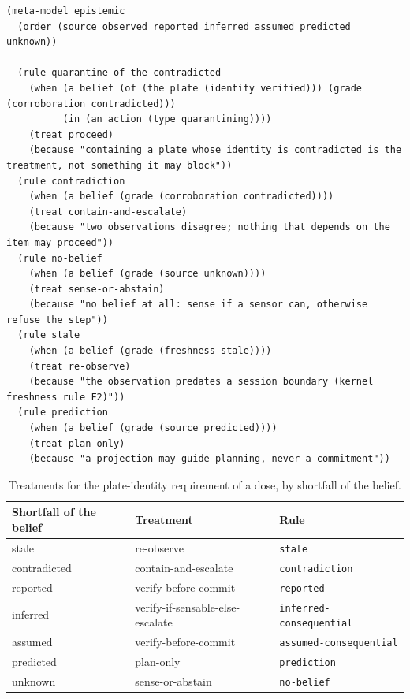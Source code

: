 \documentclass[10pt,a4paper]{article}
\begin{document}
\begin{listing}[tbp]
\begin{Verbatim}[fontsize=\footnotesize,breaklines,frame=lines,framesep=2mm]
(meta-model epistemic
  (order (source observed reported inferred assumed predicted unknown))

  (rule quarantine-of-the-contradicted
    (when (a belief (of (the plate (identity verified))) (grade (corroboration contradicted)))
          (in (an action (type quarantining))))
    (treat proceed)
    (because "containing a plate whose identity is contradicted is the treatment, not something it may block"))
  (rule contradiction
    (when (a belief (grade (corroboration contradicted))))
    (treat contain-and-escalate)
    (because "two observations disagree; nothing that depends on the item may proceed"))
  (rule no-belief
    (when (a belief (grade (source unknown))))
    (treat sense-or-abstain)
    (because "no belief at all: sense if a sensor can, otherwise refuse the step"))
  (rule stale
    (when (a belief (grade (freshness stale))))
    (treat re-observe)
    (because "the observation predates a session boundary (kernel freshness rule F2)"))
  (rule prediction
    (when (a belief (grade (source predicted))))
    (treat plan-only)
    (because "a projection may guide planning, never a commitment"))
\end{Verbatim}
\caption{The first rules of the epistemic meta model (\texttt{registry/lab/epistemic.ldl}).}\label{lst:epistemic}
\end{listing}

\begin{table}[tbp]\centering\small
\caption{Treatments for the plate-identity requirement of a dose, by shortfall of the belief.}\label{tab:treat}
\begin{tabularx}{\linewidth}{Xll}\toprule
\textbf{Shortfall of the belief} & \textbf{Treatment} & \textbf{Rule} \\\midrule
stale & re-observe & \texttt{stale} \\
contradicted & contain-and-escalate & \texttt{contradiction} \\
reported & verify-before-commit & \texttt{reported} \\
inferred & verify-if-sensable-else-escalate & \texttt{inferred-\allowbreak{}consequential} \\
assumed & verify-before-commit & \texttt{assumed-\allowbreak{}consequential} \\
predicted & plan-only & \texttt{prediction} \\
unknown & sense-or-abstain & \texttt{no-\allowbreak{}belief} \\\bottomrule
\end{tabularx}
\end{table}
\end{document}
